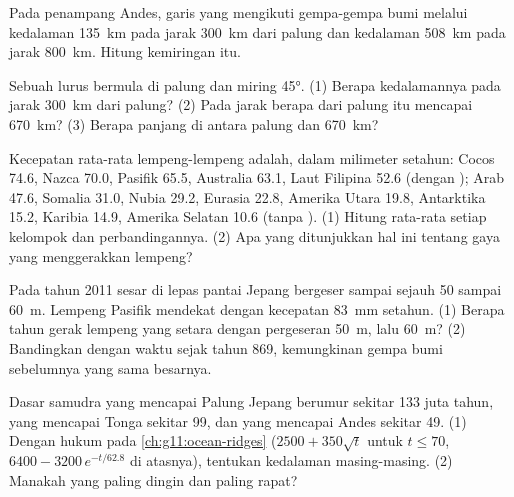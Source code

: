 \begin{exercise}[$\star\star$]\label{exo:g11:subduction-zones:6}
Pada penampang Andes, garis yang mengikuti gempa-gempa bumi melalui kedalaman
\qty{135}{km} pada jarak \qty{300}{km} dari palung dan kedalaman \qty{508}{km}
pada jarak \qty{800}{km}. Hitung kemiringan  itu.
\end{exercise}

\begin{exercise}[$\star\star$]\label{exo:g11:subduction-zones:7}
Sebuah  lurus bermula di palung dan miring \ang{45}. (1) Berapa
kedalamannya pada jarak \qty{300}{km} dari palung? (2) Pada jarak berapa dari
palung  itu mencapai \qty{670}{km}? (3) Berapa panjang  di
antara palung dan \qty{670}{km}?
\end{exercise}

\begin{exercise}[$\star\star$]\label{exo:g11:subduction-zones:8}
Kecepatan rata-rata lempeng-lempeng adalah, dalam milimeter setahun: Cocos 74.6,
Nazca 70.0, Pasifik 65.5, Australia 63.1, Laut Filipina 52.6 (dengan );
Arab 47.6, Somalia 31.0, Nubia 29.2, Eurasia 22.8, Amerika Utara 19.8,
Antarktika 15.2, Karibia 14.9, Amerika Selatan 10.6 (tanpa ).
(1) Hitung rata-rata setiap kelompok dan perbandingannya. (2) Apa yang
ditunjukkan hal ini tentang gaya yang menggerakkan lempeng?
\end{exercise}

\begin{exercise}[$\star\star$]\label{exo:g11:subduction-zones:9}
Pada tahun 2011 sesar di lepas pantai Jepang bergeser sampai sejauh 50 sampai
\qty{60}{m}. Lempeng Pasifik mendekat dengan kecepatan \qty{83}{mm} setahun.
(1) Berapa tahun gerak lempeng yang setara dengan pergeseran \qty{50}{m}, lalu
\qty{60}{m}? (2) Bandingkan dengan waktu sejak tahun 869, kemungkinan gempa bumi
sebelumnya yang sama besarnya.
\end{exercise}

\begin{exercise}[$\star\star$]\label{exo:g11:subduction-zones:10}
Dasar samudra yang mencapai Palung Jepang berumur sekitar 133 juta tahun, yang
mencapai Tonga sekitar 99, dan yang mencapai Andes sekitar 49. (1) Dengan hukum
pada \cref{ch:g11:ocean-ridges} ($2500 + 350\sqrt{t}$ untuk
$t \le 70$, $6400 - 3200\,e^{-t/62.8}$ di atasnya), tentukan kedalaman
masing-masing. (2) Manakah  yang paling dingin dan paling rapat?
\end{exercise}

